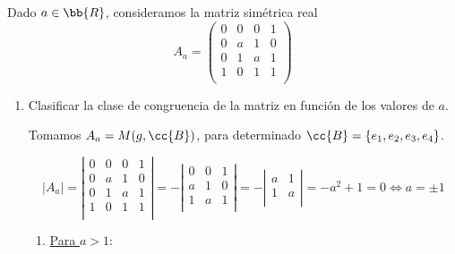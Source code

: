 \begin{ejercicio}
    Dado $a\in \bb{R}$, consideramos la matriz simétrica real
    \begin{equation*}
        A_a = \left( \begin{array}{cccc}
            0 & 0 & 0 & 1 \\
            0 & a & 1 & 0 \\
            0 & 1 & a & 1 \\
            1 & 0 & 1 & 1 \\
        \end{array} \right)
    \end{equation*}

    \begin{enumerate}
        \item Clasificar la clase de congruencia de la matriz en función de los valores de $a$.

        Tomamos $A_a=M(g, \cc{B})$, para determinado $\cc{B}=\{e_1, e_2, e_3, e_4\}$.

        \begin{equation*}
            |A_a| = \left| \begin{array}{cccc}
                0 & 0 & 0 & 1 \\
                0 & a & 1 & 0 \\
                0 & 1 & a & 1 \\
                1 & 0 & 1 & 1 \\
            \end{array} \right|
            = -\left| \begin{array}{ccc}
                0 & 0 & 1 \\
                a & 1 & 0 \\
                1 & a & 1 \\
            \end{array} \right|
            = -\left| \begin{array}{cc}
                a & 1 \\
                1 & a \\
            \end{array} \right| = -a^2 + 1 = 0\Longleftrightarrow{a=\pm 1}
        \end{equation*}
        \begin{enumerate}
            \item \underline{Para $a>1$}:


\end{enumerate}
\end{enumerate}
\end{ejercicio}
